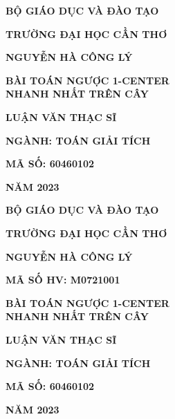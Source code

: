 \documentclass[12pt,oneside,a4paper]{bookAnh1}
\theoremstyle{plain}
\theoremstyle{nonumberplain}
\numberwithin{equation}{chapter}
\begin{document}
\thispagestyle{empty}

\begin{titlepage}{}
	
	\centerline{\bf\fontsize{14pt}{16}\selectfont BỘ GIÁO DỤC VÀ ĐÀO TẠO}
	\centerline{\bf\fontsize{14pt}{16}\selectfont TRƯỜNG ĐẠI HỌC CẦN THƠ }
	\vspace{3.0cm}
	\centerline{\bf\fontsize{14pt}{16}\selectfont NGUYỄN HÀ CÔNG LÝ}
	\vspace{3.5cm}
	\begin{center}{\bf\fontsize{20pt}{28}\selectfont BÀI TOÁN NGƯỢC 1-CENTER \\ NHANH NHẤT TRÊN CÂY}
	\end{center}
	\vspace{4.5cm} 
	\centerline{\bf\fontsize{14pt}{16}\selectfont LUẬN VĂN THẠC SĨ}
	\centerline{\bf\fontsize{14pt}{16}\selectfont NGÀNH: TOÁN GIẢI TÍCH}
	\centerline{\bf\fontsize{14pt}{16}\selectfont MÃ SỐ: 60460102}
	\vfill
	
	\centerline{\bf\fontsize{14pt}{16}\selectfont NĂM 2023}
\end{titlepage}
\newpage
\thispagestyle{empty}
\begin{titlepage}{}
	\centerline{\bf\fontsize{14pt}{16}\selectfont BỘ GIÁO DỤC VÀ ĐÀO TẠO}
	\centerline{\bf\fontsize{14pt}{16}\selectfont TRƯỜNG ĐẠI HỌC CẦN THƠ }
	\vspace*{3.0cm}
	\centerline{\bf\fontsize{14pt}{16}\selectfont NGUYỄN HÀ CÔNG LÝ}
	\centerline{\bf\fontsize{14pt}{16}\selectfont MÃ SỐ HV: M0721001}
	\vspace*{3.0cm}
	\begin{center}{\bf\fontsize{20pt}{28}\selectfont BÀI TOÁN NGƯỢC 1-CENTER \\NHANH NHẤT TRÊN CÂY }
	\end{center}
	\vspace*{2.5cm}
	
	\centerline{\bf\fontsize{14pt}{16}\selectfont LUẬN VĂN THẠC SĨ}
	\centerline{\bf\fontsize{14pt}{16}\selectfont NGÀNH: TOÁN GIẢI TÍCH}
	\centerline{\bf\fontsize{14pt}{16}\selectfont MÃ SỐ: 60460102}
	\vspace*{1.5cm}
	
	\vfill
	
	\centerline{\bf\fontsize{14pt}{16}\selectfont NĂM 2023}
\end{titlepage}
\end{document}
